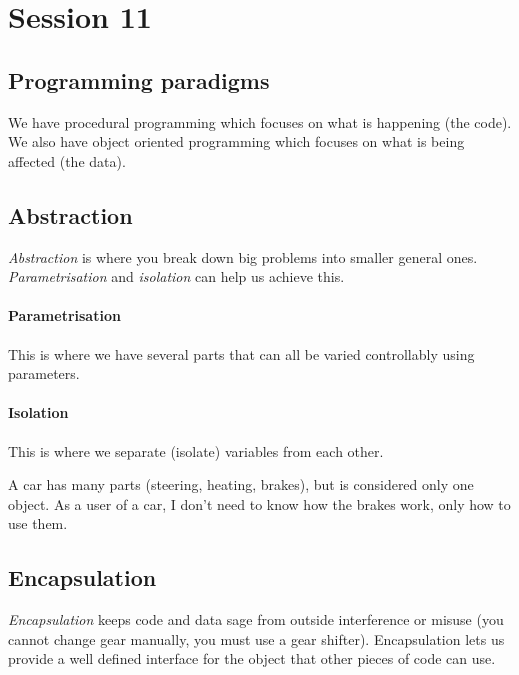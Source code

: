 \section{Session 11}\label{sec:session_11}

\subsection{Programming paradigms}\label{sub:programming_paradigms}

We have procedural programming which focuses on what is happening (the code).
We also have object oriented programming which focuses on what is being affected (the data).

\subsection{Abstraction}\label{sub:abstraction}

\emph{Abstraction} is where you break down big problems into smaller general ones.
\emph{Parametrisation} and \emph{isolation} can help us achieve this.

\paragraph{Parametrisation}\label{par:parametrisation}

This is where we have several parts that can all be varied controllably using parameters.

\paragraph{Isolation}\label{par:isolation_one}

This is where we separate (isolate) variables from each other.

\medskip
\noindent
A car has many parts (steering, heating, brakes), but is considered only one object.
As a user of a car, I don't need to know how the brakes work, only how to use them.

\subsection{Encapsulation}\label{sub:encapsulation}

\emph{Encapsulation} keeps code and data sage from outside interference or misuse (you cannot change gear manually, you must use a gear shifter).
Encapsulation lets us provide a well defined interface for the object that other pieces of code can use.

